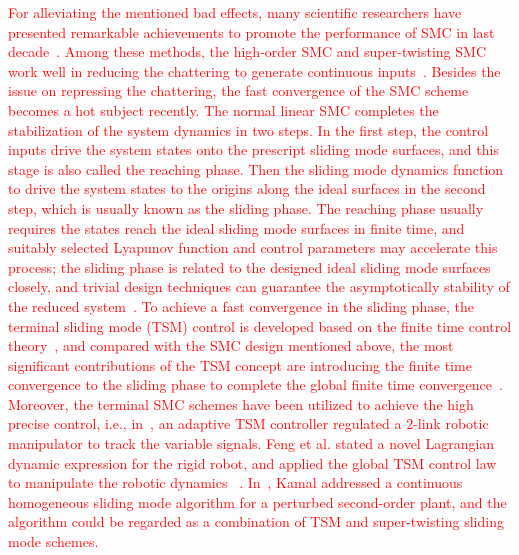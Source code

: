 \documentclass[3p]{elsarticle}
\theoremstyle{plain}
\theoremstyle{remark}
\begin{document}
\textcolor{red}{For alleviating the mentioned bad effects, many scientific researchers have presented remarkable achievements to promote the performance of SMC in last decade~\cite{zong2013quasi,santiesteban2013time,mu2015continuous,evangelista2013lyapunov,gonzalez2014chattering,dadras2012fractional,zhao2013output}. Among these methods, the high-order SMC and super-twisting SMC work well in reducing the chattering to generate continuous inputs~\cite{castillo2015higher,palosz2015laser,edwards2016adaptive,zhao2015finite,liu2015second}. Besides the issue on repressing the chattering, the fast convergence of the SMC scheme becomes a hot subject recently. The normal linear SMC completes the stabilization of the system dynamics in two steps. In the first step, the control inputs drive the system states onto the prescript sliding mode  surfaces, and this stage is also called the reaching phase. Then the sliding mode dynamics function to drive the system states to the origins along the ideal surfaces in the second step, which is usually known as the sliding phase. The reaching phase usually requires the states reach the ideal sliding mode surfaces in finite time, and suitably selected Lyapunov function and control parameters may accelerate this process; the sliding phase is related to the designed ideal sliding mode  surfaces closely, and trivial design techniques can guarantee the asymptotically stability of the reduced system~\cite{mu2016switching}. To achieve a fast convergence in the sliding phase, the terminal sliding mode (TSM) control is developed based on the finite time control theory~\cite{haimo1986finite,bhat1997finite}, and compared with the SMC design mentioned above, the most significant contributions of the TSM concept are introducing the finite time convergence to the sliding phase to complete the global finite time convergence~\cite{mu2016switching}. Moreover, the terminal SMC schemes have been utilized to achieve the high precise control, i.e., in~\cite{li2015robust}, an adaptive TSM controller regulated a $2$-link robotic manipulator to track the variable signals. Feng et al. stated a novel Lagrangian dynamic expression for the rigid robot, and applied the global TSM control law to manipulate the robotic dynamics ~\cite{feng2002non}. In~\cite{kamal2016continuous}, Kamal addressed a continuous homogeneous sliding mode algorithm for a perturbed second-order plant, and the algorithm could be regarded as a combination of TSM and super-twisting sliding mode schemes.}
\end{document}
